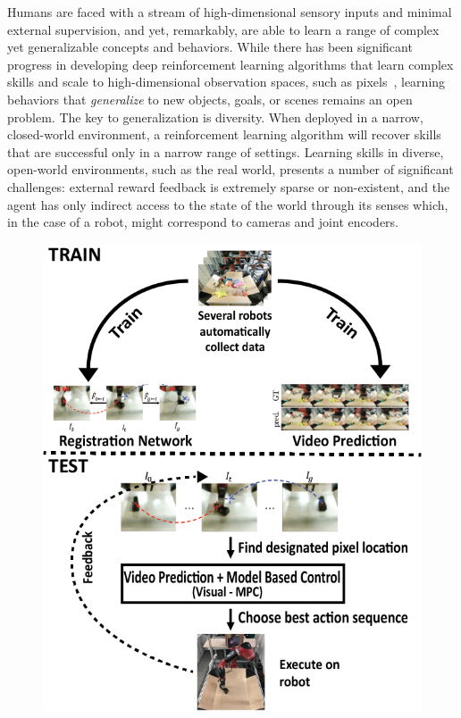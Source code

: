 
Humans are faced with a stream of high-dimensional sensory inputs and minimal external supervision, and yet, remarkably, are able to learn a range of complex yet generalizable concepts and behaviors.
While there has been significant progress in developing deep reinforcement learning algorithms that learn complex skills and scale to high-dimensional observation spaces, such as pixels~\cite{tdgammon,atari,e2e,alphago}, learning behaviors that \emph{generalize} to new objects, goals, or scenes remains an open problem.
The key to generalization is diversity. When deployed in a narrow, closed-world environment, a reinforcement learning algorithm will recover skills that are successful only in a narrow range of settings. 
Learning skills in diverse, open-world environments, such as the real world, presents a number of significant challenges: external reward feedback is extremely sparse or non-existent, and the agent has only indirect access to the state of the world through its senses which, in the case of a robot, might correspond to cameras and joint encoders.

\begin{figure}[t]
	\centering
	\includegraphics[width=.8\columnwidth,trim={3.2mm 0 0 0},clip]{images_general/new_overview.png}
	\caption{\small{}}
	\label{fig:example_traj}
\end{figure}

